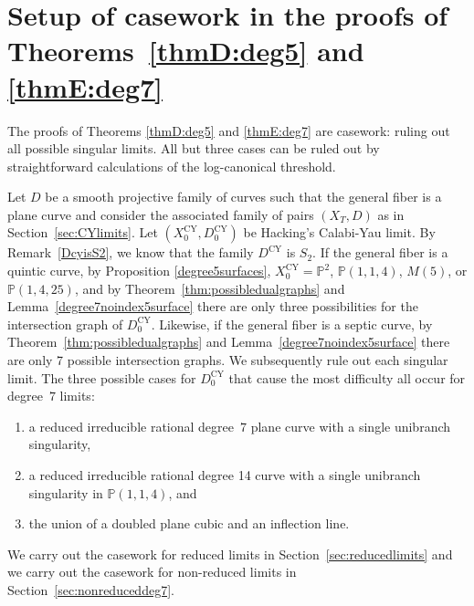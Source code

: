 \documentclass[JEP,XML,SOM,Unicode,NoFloatCountersInSection,published]{cedram}
\theoremstyle{plain}
\theoremstyle{definition}
\newcommand\PP{{\mathbb{P}}}
\newcommand\Dcy{{D^{\mathrm{CY}}}}
\newcommand\Dcyo{{D^{\mathrm{CY}}_0}}
\newcommand\Xcyo{{X^{\mathrm{CY}}_0}}
\begin{document}
\section{Setup of casework in the proofs of Theorems~\ref{thmD:deg5} and \ref{thmE:deg7}}\label{sec:caseworksetup}

The proofs of Theorems \ref{thmD:deg5} and \ref{thmE:deg7} are casework: ruling out all possible singular limits. All but three cases can be ruled out by straightforward calculations of the log-canonical threshold.

Let $D$ be a smooth projective family of curves such that the general fiber is a plane curve and consider the associated family of pairs $(X_T,D)$ as in Section~\ref{sec:CYlimits}. Let $(\Xcyo,\Dcyo)$ be Hacking's Calabi-Yau limit. By Remark~\ref{DcyisS2}, we know that the family $\Dcy$ is $S_2$. If the general fiber is a quintic curve, by Proposition \ref{degree5surfaces}, $\Xcyo = \PP^2$, $\PP(1,1,4)$, $M(5)$, or $\PP(1,4,25)$, and by Theorem~\ref{thm:possibledualgraphs} and Lemma~\ref{degree7noindex5surface} there are only three possibilities for the intersection graph of $\Dcyo$. Likewise, if the general fiber is a septic curve, by Theorem~\ref{thm:possibledualgraphs} and Lemma~\ref{degree7noindex5surface} there are only 7 possible intersection graphs. We subsequently rule out each singular limit. The three possible cases for $\Dcyo$ that cause the most difficulty all occur for degree~$7$ limits:
\begin{enumerate}
\item a reduced irreducible rational degree~$7$ plane curve with a single unibranch singularity,
\item a reduced irreducible rational degree 14 curve with a single unibranch singularity in $\PP(1,1,4)$, and
\item the union of a doubled plane cubic and an inflection line.
\end{enumerate}
We carry out the casework for reduced limits in Section~\ref{sec:reducedlimits} and we carry out the casework for non-reduced limits in Section~\ref{sec:nonreduceddeg7}.
\end{document}
